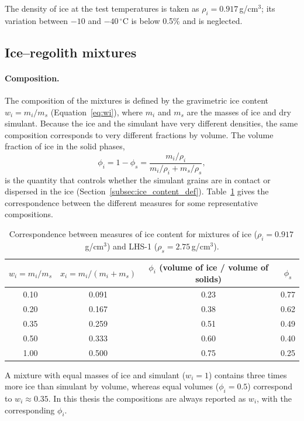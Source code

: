 The density of ice at the test temperatures is taken as $\rho_i = 0.917$\,g/cm$^3$; its variation between $-10$ and $-40\,^\circ$C is below 0.5\% and is neglected.

\subsection{Ice--regolith mixtures}
\label{subsec:mixtures}

\paragraph{Composition.} The composition of the mixtures is defined by the gravimetric ice content $w_i = m_i/m_s$ (Equation~\eqref{eq:wi}), where $m_i$ and $m_s$ are the masses of ice and dry simulant. Because the ice and the simulant have very different densities, the same composition corresponds to very different fractions by volume. The volume fraction of ice in the solid phases,
\begin{equation}
    \phi_i = 1-\phi_s = \frac{m_i/\rho_i}{m_i/\rho_i + m_s/\rho_s},
    \label{eq:phii}
\end{equation}
is the quantity that controls whether the simulant grains are in contact or dispersed in the ice (Section~\ref{subsec:ice_content_def}). Table~\ref{tab:compositions} gives the correspondence between the different measures for some representative compositions.

\begin{table}[H]
    \centering
    \caption{Correspondence between measures of ice content for mixtures of ice ($\rho_i = 0.917$\,g/cm$^3$) and LHS-1 ($\rho_s = 2.75$\,g/cm$^3$).}
    \label{tab:compositions}
    \begin{tabular}{|c|c|c|c|}
        \hline
        $w_i = m_i/m_s$ & $x_i = m_i/(m_i+m_s)$ & $\phi_i$ (volume of ice / volume of solids) & $\phi_s$ \\
        \hline
        0.10 & 0.091 & 0.23 & 0.77 \\
        0.20 & 0.167 & 0.38 & 0.62 \\
        0.35 & 0.259 & 0.51 & 0.49 \\
        0.50 & 0.333 & 0.60 & 0.40 \\
        1.00 & 0.500 & 0.75 & 0.25 \\
        \hline
    \end{tabular}
\end{table}

A mixture with equal masses of ice and simulant ($w_i = 1$) contains three times more ice than simulant by volume, whereas equal volumes ($\phi_i = 0.5$) correspond to $w_i\approx0.35$. In this thesis the compositions are always reported as $w_i$, with the corresponding $\phi_i$.

